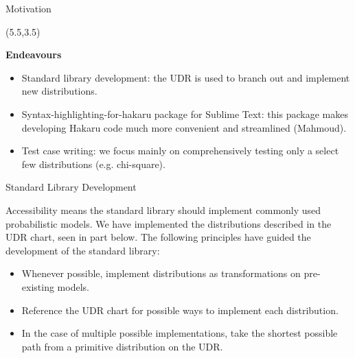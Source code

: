 \documentclass[22pt]{beamer}
\newenvironment{variableblock}[3]{%
  \setbeamercolor{block body}{#2}
  \setbeamercolor{block title}{#3}
  \begin{block}{#1}}{\end{block}}
\begin{document}
\begin{frame}[fragile]
\begin{textblock}{5}
\begin{block}{\Large{Motivation}}
\bigskip


\end{block}


\begin{textblock}{5}(5.5,3.5)

\begin{variableblock}{}{}{}
\justifying

\normalsize{\textbf{Endeavours}}

\scriptsize{
\begin{itemize}
  \item Standard library development: the UDR is used to branch out and implement new distributions. 
  \item Syntax-highlighting-for-hakaru package for Sublime Text: this package makes developing Hakaru code much more convenient and streamlined (Mahmoud).
  \item Test case writing: we focus mainly on comprehensively testing only a select few distributions (e.g. chi-square).
\end{itemize}
        }


\end{variableblock}



\begin{block}{\Large{Standard Library Development}}
\justifying

\scriptsize{Accessibility means the standard library should implement commonly used probabilistic models. We have implemented the distributions described in the UDR chart, seen in part below. The following principles have guided the development of the standard library: 


\scriptsize{

\bigskip
\begin{itemize}
  \item Whenever possible, implement distributions as transformations on pre-existing models.
  \item Reference the UDR chart for possible ways to implement each distribution.
  \item In the case of multiple possible implementations, take the shortest possible path from a primitive distribution on the UDR.
\end{itemize}
        }
}

\bigskip


\end{block}
\end{textblock}
\end{textblock}
\end{frame}
\end{document}
